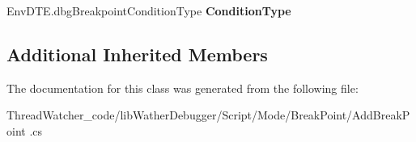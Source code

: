 \begin{DoxyCompactItemize}
\item 
\hypertarget{classlib_wather_debugger_1_1_script_1_1_mode_1_1_break_point_1_1_add_break_point_aba2a2bcead5b0fdcc26883651ca4cee6}{Env\+D\+T\+E.\+dbg\+Breakpoint\+Condition\+Type {\bfseries Condition\+Type}}\label{classlib_wather_debugger_1_1_script_1_1_mode_1_1_break_point_1_1_add_break_point_aba2a2bcead5b0fdcc26883651ca4cee6}

\end{DoxyCompactItemize}
\subsection*{Additional Inherited Members}


The documentation for this class was generated from the following file\+:\begin{DoxyCompactItemize}
\item 
Thread\+Watcher\+\_\+code/lib\+Wather\+Debugger/\+Script/\+Mode/\+Break\+Point/Add\+Break\+Point .\+cs\end{DoxyCompactItemize}
